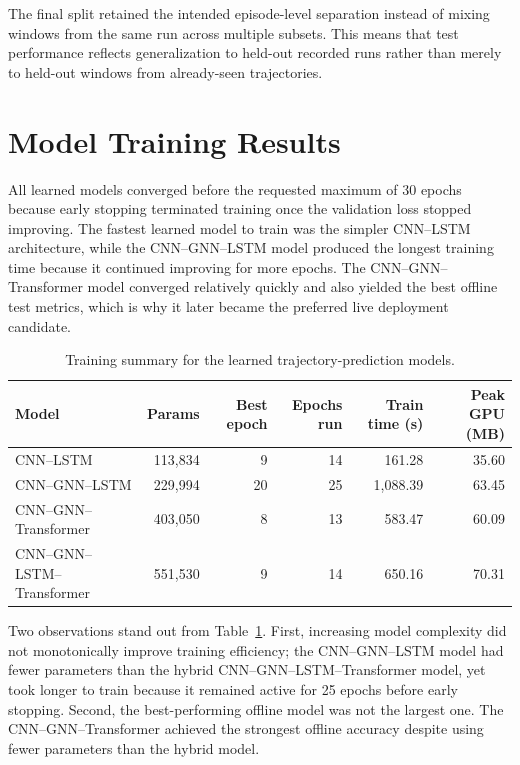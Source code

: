The final split retained the intended episode-level separation instead of mixing windows from the same run across multiple subsets. This means that test performance reflects generalization to held-out recorded runs rather than merely to held-out windows from already-seen trajectories.

\section{Model Training Results}

All learned models converged before the requested maximum of 30 epochs because early stopping terminated training once the validation loss stopped improving. The fastest learned model to train was the simpler CNN--LSTM architecture, while the CNN--GNN--LSTM model produced the longest training time because it continued improving for more epochs. The CNN--GNN--Transformer model converged relatively quickly and also yielded the best offline test metrics, which is why it later became the preferred live deployment candidate.

\begin{table}[tbp]
    \caption{Training summary for the learned trajectory-prediction models.}
    \label{tab:model_training_summary}
    \centering
    \scriptsize
    \setlength{\tabcolsep}{3pt}
    \renewcommand{\arraystretch}{1.12}
    \begin{tabular}{@{}lrrrrr@{}}
        \toprule
        \textbf{Model} & \textbf{Params} & \textbf{Best epoch} & \textbf{Epochs run} & \textbf{Train time (s)} & \textbf{Peak GPU (MB)} \\
        \midrule
        CNN--LSTM & 113,834 & 9 & 14 & 161.28 & 35.60 \\
        CNN--GNN--LSTM & 229,994 & 20 & 25 & 1,088.39 & 63.45 \\
        CNN--GNN--Transformer & 403,050 & 8 & 13 & 583.47 & 60.09 \\
        CNN--GNN--LSTM--Transformer & 551,530 & 9 & 14 & 650.16 & 70.31 \\
        \bottomrule
    \end{tabular}
\end{table}

Two observations stand out from Table~\ref{tab:model_training_summary}. First, increasing model complexity did not monotonically improve training efficiency; the CNN--GNN--LSTM model had fewer parameters than the hybrid CNN--GNN--LSTM--Transformer model, yet took longer to train because it remained active for 25 epochs before early stopping. Second, the best-performing offline model was not the largest one. The CNN--GNN--Transformer achieved the strongest offline accuracy despite using fewer parameters than the hybrid model.

